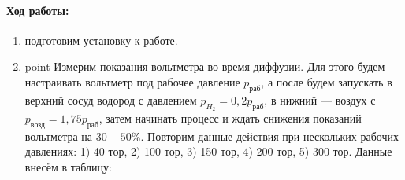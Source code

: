 \documentclass[12pt,a4paper]{article}
\begin{document}
	\paragraph{Ход работы:}
	\begin{enumerate}
		\item подготовим установку к работе.
		\item point Измерим показания вольтметра во время диффузии. Для этого будем настраивать вольтметр под рабочее давление $p_{\text{раб}}$, а после будем запускать в верхний сосуд водород с давлением $p_{H_2} = 0,2 p_{\text{раб}}$, в нижний --- воздух с $p_{\text{возд}} = 1,75 p_{\text{раб}}$, затем начинать процесс и ждать снижения показаний вольтметра на $30-50\%$. Повторим данные действия при нескольких рабочих давлениях: 1) 40 тор, 2) 100 тор, 3) 150 тор, 4) 200 тор, 5) 300 тор. Данные внесём в таблицу:
	

\end{enumerate}
\end{document}
